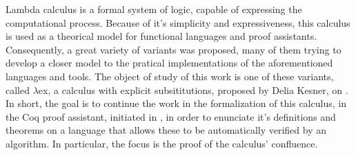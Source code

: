 Lambda calculus is a formal system of logic, capable of expressing the computational process.
Because of it's simplicity and expressiveness, this calculus is used as a theorical model
for functional languages and proof assistants. Consequently, a great variety of variants
was proposed, many of them trying to develop a closer model to the pratical implementations
of the aforementioned languages and tools.
The object of study of this work is one of these variants, called $\lambda$ex, 
a calculus with explicit subsititutions, proposed by Delia Kesner, on \cite{delia}.
In short, the goal is to continue the work in the formalization of this calculus, 
in the Coq proof assistant, initiated in \cite{initial}, in order to
enunciate it's definitions and theorems on a language that allows these to be automatically
verified by an algorithm.
In particular, the focus is the proof of the calculus' confluence.
